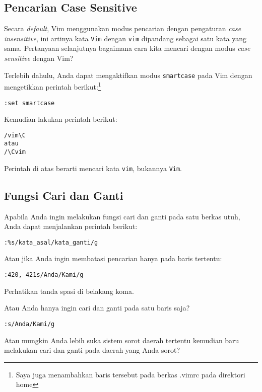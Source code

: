 \documentclass{article}
\begin{document}
\subsection{Pencarian Case Sensitive}

Secara \emph{default}, Vim menggunakan modus pencarian
dengan pengaturan \emph{case insensitive}, ini artinya kata
\verb=Vim= dengan \verb=vim= dipandang sebagai satu kata
yang sama. Pertanyaan selanjutnya bagaimana cara kita
mencari dengan modus \emph{case sensitive} dengan Vim?

Terlebih dahulu, Anda dapat mengaktifkan modus
\verb=smartcase= pada Vim dengan mengetikkan perintah
berikut:\footnote{Saya juga menambahkan baris tersebut pada
berkas .vimrc pada direktori home}

\begin{verbatim}
:set smartcase
\end{verbatim}

Kemudian lakukan perintah berikut:

\begin{verbatim}
/vim\C
atau
/\Cvim
\end{verbatim}

Perintah di atas berarti mencari kata \verb=vim=, bukannya
\verb=Vim=.

\subsection{Fungsi Cari dan Ganti}
Apabila Anda ingin melakukan fungsi cari dan ganti pada
satu berkas utuh, Anda dapat menjalankan perintah berikut:

\begin{verbatim}
:%s/kata_asal/kata_ganti/g
\end{verbatim}

Atau jika Anda ingin membatasi pencarian hanya pada baris
tertentu:

\begin{verbatim}
:420, 421s/Anda/Kami/g
\end{verbatim}

Perhatikan tanda spasi di belakang koma.

Atau Anda hanya ingin cari dan ganti pada satu baris saja?

\begin{verbatim}
:s/Anda/Kami/g
\end{verbatim}

Atau mungkin Anda lebih suka sistem sorot daerah tertentu
kemudian baru melakukan cari dan ganti pada daerah yang Anda
sorot? 
\end{document}
